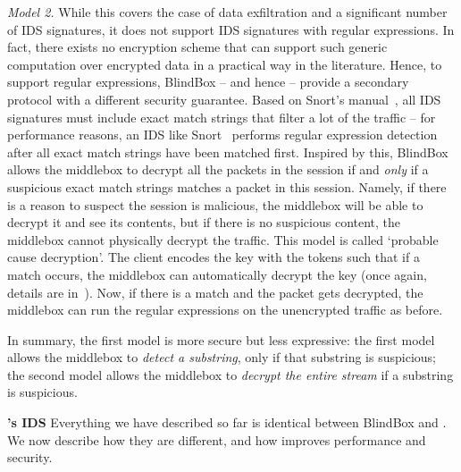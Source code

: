  {\em Model 2.}  While this covers the case of data exfiltration and a significant number of IDS signatures, it does not support  IDS signatures with regular expressions.
 In fact, there exists no encryption scheme that can support such generic computation over encrypted data in a practical way in the literature. 
  Hence, to support regular expressions, BlindBox -- and hence \sys -- provide a secondary protocol with a different security guarantee. 
  Based on Snort's manual~\cite{Snort}, all  IDS signatures must include exact match strings that filter a lot of the traffic -- for performance reasons, an IDS like Snort~\cite{Snort} performs regular expression detection after all exact match strings have been matched first.
  Inspired by this, BlindBox allows the middlebox to decrypt all the packets in the session if and {\it only} if a suspicious exact match strings matches a packet in this session.
  Namely, if there is a reason to suspect the session is malicious, the middlebox will be able to decrypt it and see its contents, but if there is no suspicious content, the middlebox cannot physically decrypt the traffic.  This model is called `probable cause decryption'.
  The client encodes the key with the tokens such that if a match occurs, the middlebox can automatically decrypt the key (once again, details are in~\cite{blindbox}).
  Now, if there is a match and the packet gets decrypted, the middlebox can run the regular expressions on the unencrypted traffic as before. 
  
  
  In summary, the first model is more secure but less expressive: 
  the first model allows the middlebox to {\it detect a substring}, only if that substring is suspicious;
  the second model allows the middlebox to {\it decrypt the entire stream} if a substring is suspicious.
  
\noindent\textbf{\sys's IDS}  
  Everything we have described so far is identical between BlindBox and \sys. We now describe how they are different, and how \sys improves performance and security.

